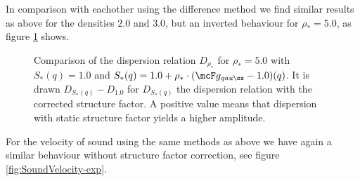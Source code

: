 In comparison with eachother using the difference method we find similar results as above for the densities $2.0$ and $3.0$, but an inverted behaviour for $\rho_* = 5.0$, as figure \ref{fig:DispersionRelationComparison-exp} shows. 
\begin{figure}[H]
    \centering
    \caption{Comparison of the dispersion relation $D_{\rho_*}$ for $\rho_* = 5.0$ with $S_*(q) = 1.0$ and $S_*(q) = 1.0 + \rho_*\cdot(\mcF g_{\mathit{gauß}} - 1.0)(q)$. It is drawn $D_{S_*(q)} - D_{1.0}$ for $D_{S_*(q)}$ the dispersion relation with the corrected structure factor. A positive value means that dispersion with static structure factor yields a higher amplitude.}
    \label{fig:DispersionRelationComparison-exp}
\end{figure}
For the velocity of sound using the same methods as above we have again a similar behaviour without structure factor correction, see figure \ref{fig:SoundVelocity-exp}.
